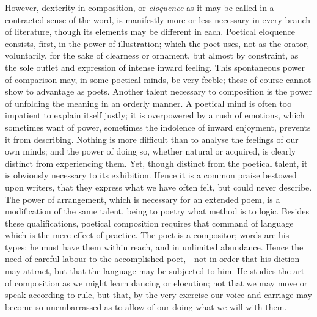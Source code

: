 However, dexterity in composition, or \emph{eloquence} as it may be
called in a contracted sense of the word, is manifestly more or less
necessary in every branch of literature, though its elements may be
different in each. Poetical eloquence consists, first, in the power of
illustration; which the poet uses, not as the orator, voluntarily, for
the sake of clearness or ornament, but almost by constraint, as the
sole outlet and expression of intense inward feeling. This spontaneous
power of comparison may, in some poetical minds, be very feeble; these
of course cannot show to advantage as poets. Another talent necessary
to composition is the power of unfolding the meaning in an orderly
manner. A poetical mind is often too impatient to explain itself
justly; it is overpowered by a rush of emotions, which sometimes want
of power, sometimes the indolence of inward enjoyment, prevents it
from describing. Nothing is more difficult than to analyse the
feelings of our own minds; and the power of doing so, whether natural
or acquired, is clearly distinct from experiencing them. Yet, though
distinct from the poetical talent, it is obviously necessary to its
exhibition. Hence it is a common praise bestowed upon writers, that
they express what we have often felt, but could never describe. The
power of arrangement, which is necessary for an extended poem, is a
modification of the same talent, being to poetry what method is to
logic. Besides these qualifications, poetical composition requires
that command of language which is the mere effect of practice. The
poet is a compositor; words are his types; he must have them within
reach, and in unlimited abundance. Hence the need of careful labour to
the accomplished poet,—not in order that his diction may attract,
but that the language may be subjected to him. He studies the art of
composition as we might learn dancing or elocution; not that we may
move or speak according to rule, but that, by the very exercise our
voice and carriage may become so unembarrassed as to allow of our
doing what we will with them.

